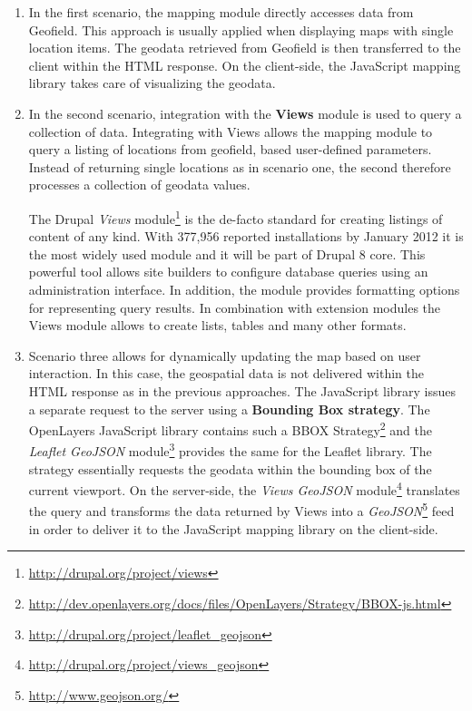 \begin{enumerate}

\item In the first scenario, the mapping module directly accesses data from Geofield. This approach is usually applied when displaying maps with single location items. The geodata retrieved from Geofield is then transferred to the client within the HTML response. On the client-side, the JavaScript mapping library takes care of visualizing the geodata.

\item In the second scenario, integration with the \textbf{Views} module is used to query a collection of data. Integrating with Views allows the mapping module to query a listing of locations from geofield, based user-defined parameters. Instead of returning single locations as in scenario one, the second therefore processes a collection of geodata values.

The Drupal \textit{Views} module\footnote{\url{http://drupal.org/project/views}} is the de-facto standard for creating listings of content of any kind. With 377,956 reported installations by January 2012 it is the most widely used module and it will be part of Drupal 8 core. This powerful tool allows site builders to configure database queries using an administration interface. In addition, the module provides formatting options for representing query results. In combination with extension modules the Views module allows to create lists, tables and many other formats.  

\item Scenario three allows for dynamically updating the map based on user interaction. In this case, the geospatial data is not delivered within the HTML response as in the previous approaches. The JavaScript library issues a separate request to the server using a \textbf{Bounding Box strategy}. The OpenLayers JavaScript library contains such a BBOX Strategy\footnote{\url{http://dev.openlayers.org/docs/files/OpenLayers/Strategy/BBOX-js.html}} and the \textit{Leaflet GeoJSON} module\footnote{\url{http://drupal.org/project/leaflet_geojson}} provides the same for the Leaflet library. The strategy essentially requests the geodata within the bounding box of the current viewport. On the server-side, the \textit{Views GeoJSON} module\footnote{\url{http://drupal.org/project/views_geojson}} translates the query and transforms the data returned by Views into a \textit{GeoJSON}\footnote{\url{http://www.geojson.org/}} feed in order to deliver it to the JavaScript mapping library on the client-side.

\end{enumerate}

